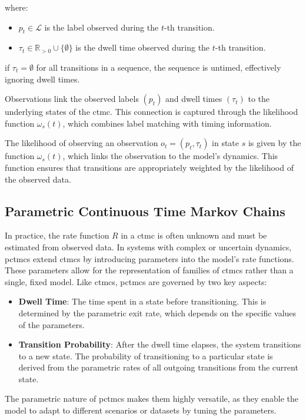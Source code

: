where:
\begin{itemize}
    \item $p_t \in \mathcal{L}$ is the label observed during the $t$-th transition.
    \item $\tau_t \in \mathbb{R}_{>0} \cup \{\emptyset\}$ is the dwell time observed during the $t$-th transition.
\end{itemize}
if $\tau_t = \emptyset$ for all transitions in a sequence, the sequence is untimed, effectively ignoring dwell times.

Observations link the observed labels $(p_t)$ and dwell times $(\tau_t)$ to the underlying states of the \gls{ctmc}. This connection is captured through the likelihood function $\omega_s(t)$, which combines label matching with timing information.

The likelihood of observing an observation $o_t = (p_t, \tau_t)$ in state $s$ is given by the function $\omega_s(t)$, which links the observation to the model's dynamics. This function ensures that transitions are appropriately weighted by the likelihood of the observed data.

\subsection{Parametric Continuous Time Markov Chains}\label{subsec:parametric-ctmc}
In practice, the rate function $R$ in a \gls{ctmc} is often unknown and must be estimated from observed data.
In systems with complex or uncertain dynamics, \glspl{pctmc} extend \glspl{ctmc} by introducing parameters into the model's rate functions. These parameters allow for the representation of families of \glspl{ctmc} rather than a single, fixed model. Like \glspl{ctmc}, \glspl{pctmc} are governed by two key aspects:
\begin{itemize}
    \item \textbf{Dwell Time}: The time spent in a state before transitioning. This is determined by the parametric exit rate, which depends on the specific values of the parameters.
    \item \textbf{Transition Probability}: After the dwell time elapses, the system transitions to a new state. The probability of transitioning to a particular state is derived from the parametric rates of all outgoing transitions from the current state.
\end{itemize}

The parametric nature of \glspl{pctmc} makes them highly versatile, as they enable the model to adapt to different scenarios or datasets by tuning the parameters.


